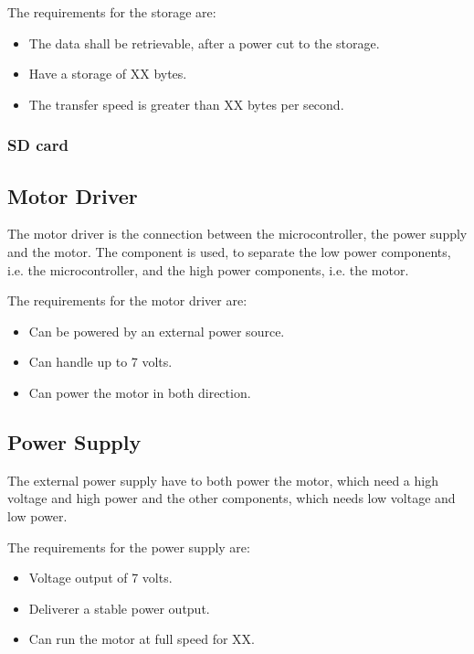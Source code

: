 The requirements for the storage are:
\begin{itemize}
\item The data shall be retrievable, after a power cut to the storage. 
\item Have a storage of XX bytes. 
\item The transfer speed is greater than XX bytes per second. 
\end{itemize}

\subsubsection{SD card}


\subsection{Motor Driver}
The motor driver is the connection between the microcontroller, the power supply and the motor. The component is used, to separate the low power components, i.e. the microcontroller, and the high power components, i.e. the motor.

The requirements for the motor driver are:
\begin{itemize}
\item Can be powered by an external power source.
\item Can handle up to 7 volts. 
\item Can power the motor in both direction.
\end{itemize}


\subsection{Power Supply}
The external power supply have to both power the motor, which need a high voltage and high power and the other components, which needs low voltage and low power.

The requirements for the power supply are:
\begin{itemize}
\item Voltage output of 7 volts. 
\item Deliverer a stable power output.
\item Can run the motor at full speed for XX. 
\end{itemize}

